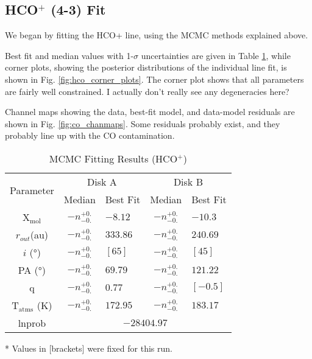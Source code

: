 \subsection{HCO$^+$ (4-3) Fit}

We began by fitting the HCO+ line, using the MCMC methods explained above.

Best fit and median values with 1-$\sigma$  uncertainties are given in Table \ref{table:fit_hco}, while corner plots, showing the posterior distributions of the individual line fit, is shown in Fig. \ref{fig:hco_corner_plots}. The corner plot shows that all parameters are fairly well constrained. I actually don't really see any degeneracies here?

Channel maps showing the data, best-fit model, and data-model residuals are shown in Fig. \ref{fig:co_chanmaps}. Some residuals probably exist, and they probably line up with the CO contamination.


\begin{table}
  \centering
  \begin{threeparttable}
    \caption{MCMC Fitting Results (HCO$^+$)}
    \label{table:fit_hco}
    \renewcommand{\arraystretch}{1.2}
    \begin{tabular}{c c l c l }
      \toprule \toprule
      \multirow{2}{*}{Parameter} & \multicolumn{2}{c}{Disk A} & \multicolumn{2}{c}{Disk B} \\
                                 & Median & Best Fit          & Median & Best Fit \\
      \midrule %
      X$_\text{mol}$            & $ -n _{-0.} ^{+0.}$ & $-8.12$    & $ -n _{-0.} ^{+0.}$ & $-10.3$ \\
      $r_{out}$(\si{au})        & $ -n _{-0.} ^{+0.}$ & $333.86$    & $ -n _{-0.} ^{+0.}$  & $240.69$    \\
      $i$ (\si{\degree})        & $ -n _{-0.} ^{+0.}$ & $[65]$    & $ -n _{-0.} ^{+0.}$ & $[45]$    \\
      PA  (\si{\degree})        & $ -n _{-0.} ^{+0.}$ & $69.79$  & $ -n _{-0.} ^{+0.}$  & $121.22$  \\
      q                         & $ -n _{-0.} ^{+0.}$ & $0.77$  & $ -n _{-0.} ^{+0.}$  & $[-0.5]$  \\
      T$_\text{atms}$ (\si{\K}) & $ -n _{-0.} ^{+0.}$ & $172.95 $  & $ -n _{-0.} ^{+0.}$  & $183.17$  \\
      lnprob                    & \multicolumn{4}{c}{$-28404.97$} \\
      \bottomrule
    \end{tabular}
    \begin{tablenotes}\footnotesize
      \item[*] Values in [brackets] were fixed for this run.
    \end{tablenotes}
  \end{threeparttable}
\end{table}








